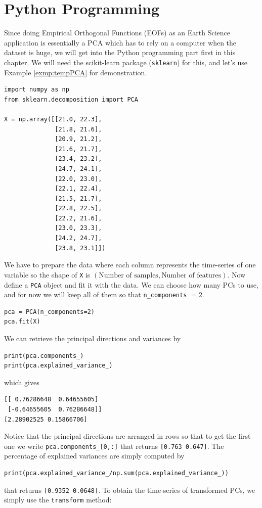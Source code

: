 \section{Python Programming}
Since doing Empirical Orthogonal Functions (EOFs) as an Earth Science application is essentially a PCA which has to rely on a computer when the dataset is huge, we will get into the Python programming part first in this chapter. We will need the scikit-learn package (\texttt{sklearn}) for this, and let's use Example \ref{exmp:tempPCA} for demonstration.
\begin{lstlisting}
import numpy as np
from sklearn.decomposition import PCA    

X = np.array([[21.0, 22.3],
              [21.8, 21.6],
              [20.9, 21.2],
              [21.6, 21.7],
              [23.4, 23.2],
              [24.7, 24.1],
              [22.0, 23.0],
              [22.1, 22.4],
              [21.5, 21.7],
              [22.8, 22.5],
              [22.2, 21.6],
              [23.0, 23.3],
              [24.2, 24.7],
              [23.8, 23.1]])
\end{lstlisting}
We have to prepare the data where each column represents the time-series of one variable so the shape of \verb|X| is $(\text{Number of samples}, \text{Number of features})$. Now define a \verb|PCA| object and fit it with the data. We can choose how many PCs to use, and for now we will keep all of them so that \verb|n_components| $=2$.
\begin{lstlisting}
pca = PCA(n_components=2)
pca.fit(X)    
\end{lstlisting}
We can retrieve the principal directions and variances by
\begin{lstlisting}
print(pca.components_)
print(pca.explained_variance_)    
\end{lstlisting}
which gives
\begin{lstlisting}
[[ 0.76286648  0.64655605]
 [-0.64655605  0.76286648]]
[2.28902525 0.15866706] 
\end{lstlisting}
Notice that the principal directions are arranged in rows so that to get the first one we write \verb|pca.components_[0,:]| that returns \verb|[0.763 0.647]|. The percentage of explained variances are simply computed by
\begin{lstlisting}
print(pca.explained_variance_/np.sum(pca.explained_variance_))
\end{lstlisting}
that returns \verb|[0.9352 0.0648]|. To obtain the time-series of transformed PCs, we simply use the \verb|transform| method:
